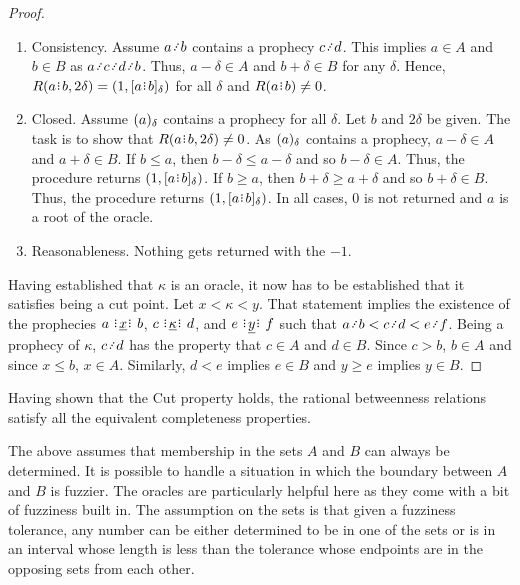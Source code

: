 \documentclass[12pt]{article}
\begin{document}
\begin{proof}
\begin{enumerate}
    \item Consistency. Assume $a \lte b$ contains a prophecy $c \lte d$. This implies $a \in A$ and $b \in B$ as $a \lte c \lte d \lte b$. Thus, $a-\delta \in A$ and $b+\delta \in B$ for any $\delta$. Hence, $R(a\rint b, 2 \delta) = (1, \clhalo{a\rint b})$ for all $\delta$ and $R(a\rint b) \neq 0$. 
    
    
    \item Closed. Assume $(a)_{\delta}$ contains a prophecy for all $\delta$. Let $b$ and $2\delta$ be given. The task is to show that $R(a\rint b, 2\delta) \neq 0$. As $(a)_{\delta}$ contains a prophecy, $a-\delta \in A$ and $a+\delta \in B$. If $b \leq a$, then $b-\delta \leq a- \delta$ and so $b-\delta \in A$. Thus, the procedure returns $(1, \clhalo{a\rint b})$. If $b \geq a$, then $b+\delta \geq  a+\delta$ and so $b+\delta \in B$. Thus, the procedure returns $(1, \clhalo{a\rint b})$. In all cases, $0$ is not returned and $a$ is a root of the oracle. 

    \item Reasonableness. Nothing gets returned with the $-1$.
\end{enumerate}

Having established that $\kappa$ is an oracle, it now has to be established that it satisfies being a cut point. Let $x < \kappa < y$. That statement implies the existence of the prophecies $a \xrel b$, $c \xrel[\kappa] d$, and $ e \xrel[y] f$ such that $a \lte b < c \lte d < e \lte f$. Being a prophecy of $\kappa$, $c \lte d$ has the property that $c \in A$ and $d \in B$. Since $c > b$, $b \in A$ and since $x \leq b$, $x \in A$. Similarly, $d < e$ implies $e \in B$ and $y \geq e$ implies $y \in B$.

\end{proof}

Having shown that the Cut property holds, the rational betweenness relations satisfy all the equivalent completeness properties. 

The above assumes that membership in the sets $A$ and $B$ can always be determined. It is possible to handle a situation in which the boundary between $A$ and $B$ is fuzzier. The oracles are particularly helpful here as they come with a bit of fuzziness built in. The assumption on the sets is that given a fuzziness tolerance, any number can be either determined to be in one of the sets or is in an interval whose length is less than the tolerance whose endpoints are in the opposing sets from each other. 
\end{document}
